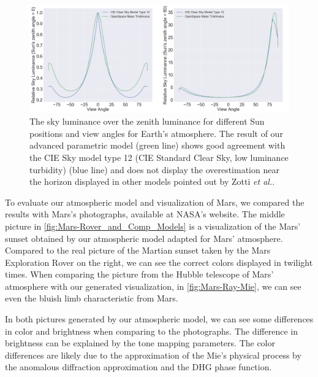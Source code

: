 \documentclass[journal]{vgtc}                %
\newcommand{\joncomment}[1]{\textbf{[JC~} \textcolor{red}{#1} \textbf{~]}}
\newcommand{\etal}{\emph{et al.}}
\begin{document}
\begin{figure}
  \centering
  \includegraphics[width=\linewidth]{figures/validation-smaller.png}
  \vspace*{-7mm}
  \caption{The sky luminance over the zenith luminance for different Sun positions and view angles for Earth's atmosphere. The result of our advanced parametric model (green line) shows good agreement with the CIE Sky model type 12 (CIE Standard Clear Sky, low luminance turbidity) (blue line) and does not display the overestimation near the horizon displayed in other models \cite{BrunetonNeyret:2008, Preetham:1999} pointed out by Zotti \etal \cite{Zotti:2007}.}
  \label{fig:validation_curves}
  \vspace*{-6mm}
\end{figure}

To evaluate our atmospheric model and visualization of Mars, we compared the results with Mars's photographs, available at NASA's website. The middle picture in \autoref{fig:Mars-Rover_and_Comp_Models} is a visualization of the Mars' sunset obtained by our atmospheric model adapted for Mars' atmosphere. Compared to the real picture of the Martian sunset taken by the Mars Exploration Rover on the right, we can see the correct colors displayed in twilight times. When comparing the picture from the Hubble telescope of Mars' atmosphere with our generated visualization, in \autoref{fig:Mars-Ray-Mie}, we can see even the bluish limb characteristic from Mars.

In both pictures generated by our atmospheric model, we can see some differences in color and brightness when comparing to the photographs. The difference in brightness can be explained by the tone mapping parameters.  The color differences are likely due to the approximation of the Mie's physical process by the anomalous diffraction approximation and the DHG phase function.
\end{document}
